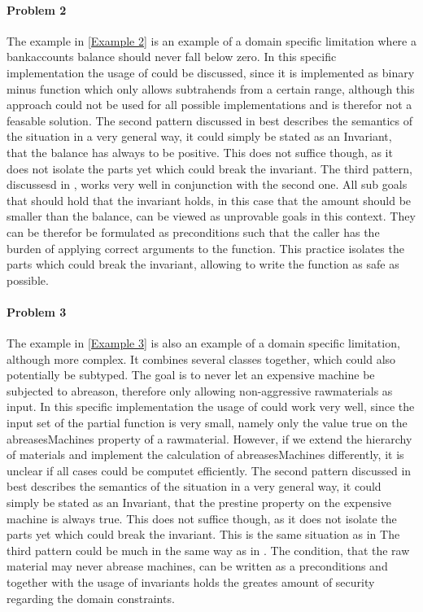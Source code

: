 \paragraph{Problem 2} \label{Problem 2}
The example in \ref{Example 2} is an example of a domain specific limitation where a bankaccounts balance should never fall below zero. In this specific implementation the usage of  could be discussed, since it is implemented as binary minus function which only allows subtrahends from a certain range, although this approach could not be used for all possible implementations and is therefor not a feasable solution. \newline
The second pattern discussed in  best describes the semantics of the situation in a very general way, it could simply be stated as an Invariant, that the balance has always to be positive. This does not suffice though, as it does not isolate the parts yet which could break the invariant. \newline
The third pattern, discussesd in , works very well in conjunction with the second one. All sub goals that should hold that the invariant holds, in this case that the amount should be smaller than the balance, can be viewed as unprovable goals in this context. They can be therefor be formulated as preconditions such that the caller has the burden of applying correct arguments to the function. This practice isolates the parts which could break the invariant, allowing to write the function as safe as possible.

\paragraph{Problem 3}
The example in \ref{Example 3} is also an example of a domain specific limitation, although more complex. It combines several classes together, which could also potentially be subtyped. The goal is to never let an expensive machine be subjected to abreason, therefore only allowing non-aggressive rawmaterials as input. In this specific implementation the usage of  could work very well, since the input set of the partial function is very small, namely only the value true on the abreasesMachines property of a rawmaterial. However, if we extend the hierarchy of materials and implement the calculation of abreasesMachines differently, it is unclear if all cases could be computet efficiently. \newline
The second pattern discussed in  best describes the semantics of the situation in a very general way, it could simply be stated as an Invariant, that the prestine property on the expensive machine is always true. This does not suffice though, as it does not isolate the parts yet which could break the invariant. This is the same situation as in  \newline
The third pattern could be much in the same way as in . The condition, that the raw material may never abrease machines, can be written as a preconditions and together with the usage of invariants holds the greates amount of security regarding the domain constraints.

